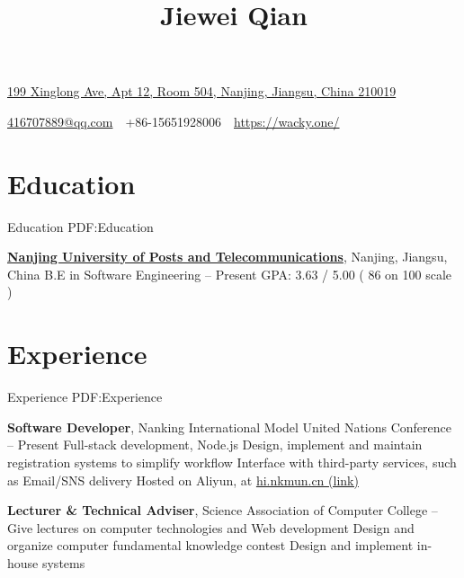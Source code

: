 \documentclass[a4paper,MMMyyyy,nonstop]{simpleresumecv}
\newcommand{\CVAuthor}{Jiewei Qian}
\newcommand{\CVWebpage}{https://wacky.one/}
\begin{document}
\thispagestyle{empty}


\title{\CVAuthor}

\begin{subtitle}
\href{https://www.google.com/maps/place/504,+199+Xing+Long+Da+Jie,+Jianye+Qu,+Nanjing+Shi,+Jiangsu+Sheng,+China,+210019/}
{199 Xinglong Ave, Apt 12, Room 504, Nanjing, Jiangsu, China 210019}
\par
\href{mailto:416707889@qq.com}
{416707889@qq.com}
\,\SubBulletSymbol\,
+86-15651928006
\,\SubBulletSymbol\,
\href{\CVWebpage}
{\CVWebpage}
\end{subtitle}

\begin{body}


\section
{Education}
{Education}
{PDF:Education}

\href{http://www.njupt.edu.cn/}
{\textbf{Nanjing University of Posts and Telecommunications}},
Nanjing, Jiangsu, China
\BulletItem
B.E in Software Engineering
\hfill
{} --
Present
\BulletItem
GPA: 3.63 / 5.00 ( 86 on 100 scale )


\section
{Experience}
{Experience}
{PDF:Experience}

\textbf{Software Developer}, Nanking International Model United Nations Conference
\hfill {} -- Present
\BulletItem
Full-stack development, Node.js
\BulletItem
Design, implement and maintain registration systems to simplify workflow
\BulletItem
Interface with third-party services, such as Email/SNS delivery
\BulletItem
Hosted on Aliyun, at \href{https://hi.nkmun.cn/}{hi.nkmun.cn (link)}
\GapNoBreak

\textbf{Lecturer \& Technical Adviser}, Science Association of Computer College
\hfill {} -- 
\BulletItem
Give lectures on computer technologies and Web development
\BulletItem
Design and organize computer fundamental knowledge contest
\BulletItem
Design and implement in-house systems


\end{body}
\end{document}
